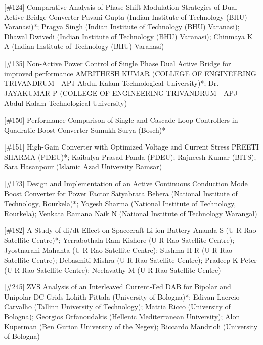 {} \begin{abstract_online} {[\#124] Comparative Analysis of Phase Shift Modulation Strategies of Dual Active Bridge Converter} {} {Pavani Gupta (Indian Institute of Technology (BHU) Varanasi)*; Pragya Singh (Indian Institute of Technology (BHU) Varanasi); Dhawal Dwivedi (Indian Institute of Technology (BHU) Varanasi); Chinmaya K A (Indian Institute of Technology (BHU) Varanasi)} {}  \end{abstract_online} 
{} \begin{abstract_online} {[\#135] Non-Active Power Control of Single Phase Dual Active Bridge for improved performance} {} {AMRITHESH KUMAR (COLLEGE OF ENGINEERING TRIVANDRUM - APJ Abdul Kalam Technological University)*; Dr. JAYAKUMAR P (COLLEGE OF ENGINEERING TRIVANDRUM - APJ Abdul Kalam Technological University)} {}  \end{abstract_online} 
{} \begin{abstract_online} {[\#150] Performance Comparison of Single and Cascade Loop Controllers in Quadratic Boost Converter} {} {Sumukh Surya (Bosch)*} {}  \end{abstract_online} 
{} \begin{abstract_online} {[\#151] High-Gain Converter with Optimized Voltage and Current Stress  } {} {PREETI SHARMA (PDEU)*; Kaibalya Prasad Panda (PDEU); Rajneesh  Kumar (BITS); Sara Hasanpour (Islamic Azad University Ramsar)} {}  \end{abstract_online} 
{} \begin{abstract_online} {[\#173] Design and Implementation of an Active Continuous Conduction Mode Boost Converter for Power Factor } {} {Satyabrata Behera (National Institute of Technology, Rourkela)*; Yogesh  Sharma  (National Institute of Technology, Rourkela); Venkata Ramana  Naik N (National Institute of Technology Warangal)} {}  \end{abstract_online} 
{} \begin{abstract_online} {[\#182] A Study of di/dt Effect on Spacecraft Li-ion Battery} {} {Ananda S (U R Rao Satellite Centre)*; Yerrabothala Ram Kishore (U R Rao Satellite Centre); Jyostnarani Mahanta (U R Rao Satellite Centre); Sushma H R (U R Rao Satellite Centre); Debasmiti Mishra (U R Rao Satellite Centre); Pradeep K Peter (U R Rao Satellite Centre); Neelavathy M (U R Rao Satellite Centre)} {}  \end{abstract_online} 
{} \begin{abstract_online} {[\#245] ZVS Analysis of an Interleaved Current-Fed DAB for Bipolar and Unipolar DC Grids} {} {Lohith Pittala (University of Bologna)*; Edivan Laercio Carvalho (Tallinn University of Technology); Mattia Ricco (University of Bologna); Georgios Orfanoudakis (Hellenic Mediterranean University); Alon  Kuperman (Ben Gurion University of the Negev); Riccardo Mandrioli (University of Bologna)} {}  \end{abstract_online} 
